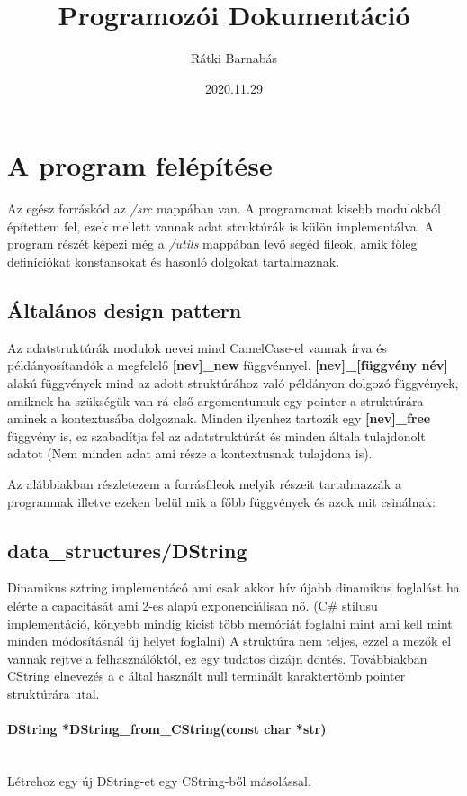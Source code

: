 \documentclass{article}[12pt,a4paper]
\title{Programozói Dokumentáció}
\author{Rátki Barnabás}
\date{2020.11.29}
\newcommand{\lang}[1]{\textit{#1}}
\newcommand{\fn}[1]{\paragraph{#1}\mbox{}\\}
\begin{document}
    \maketitle

    \tableofcontents
    
    \section{A program felépítése}
    Az egész forráskód az \lang{/src} mappában van.
    A programomat kisebb modulokból építettem fel, ezek mellett vannak adat struktúrák is külön implementálva.
    A program részét képezi még a \lang{/utils} mappában levő segéd fileok, amik főleg definíciókat konstansokat és hasonló dolgokat tartalmaznak.

    \subsection{Általános design pattern}
    Az adatstruktúrák modulok nevei mind CamelCase-el vannak írva és példányosítandók a megfelelő \textbf{[nev]\_new} függvénnyel.
    \textbf{[nev]\_[függvény név]} alakú függvények mind az adott struktúrához való példányon dolgozó függvények, amiknek ha szükségük van rá első argomentumuk egy pointer a struktúrára aminek a kontextusába dolgoznak.
    Minden ilyenhez tartozik egy \textbf{[nev]\_free} függvény is, ez szabadítja fel az adatstruktúrát és minden általa tulajdonolt adatot (Nem minden adat ami része a kontextusnak tulajdona is).

    Az alábbiakban részletezem a forrásfileok melyik részeit tartalmazzák a programnak illetve ezeken belül mik a főbb függvények és azok mit csinálnak:
    
    \subsection{data\_structures/DString}
    Dinamikus sztring implementácó ami csak akkor hív újabb dinamikus foglalást ha elérte a capacitását ami 2-es alapú exponenciálisan nő. (C\# stílusu implementáció, könyebb mindig kicist több memóriát foglalni mint ami kell mint minden módosításnál új helyet foglalni)
    A struktúra nem teljes, ezzel a mezők el vannak rejtve a felhasználóktól, ez egy tudatos dizájn döntés.
    Továbbiakban CString elnevezés a c által használt null terminált karaktertömb pointer struktúrára utal.

    \fn{DString *DString\_from\_CString(const char *str)}
    Létrehoz egy új DString-et egy CString-ből másolással.
\end{document}
